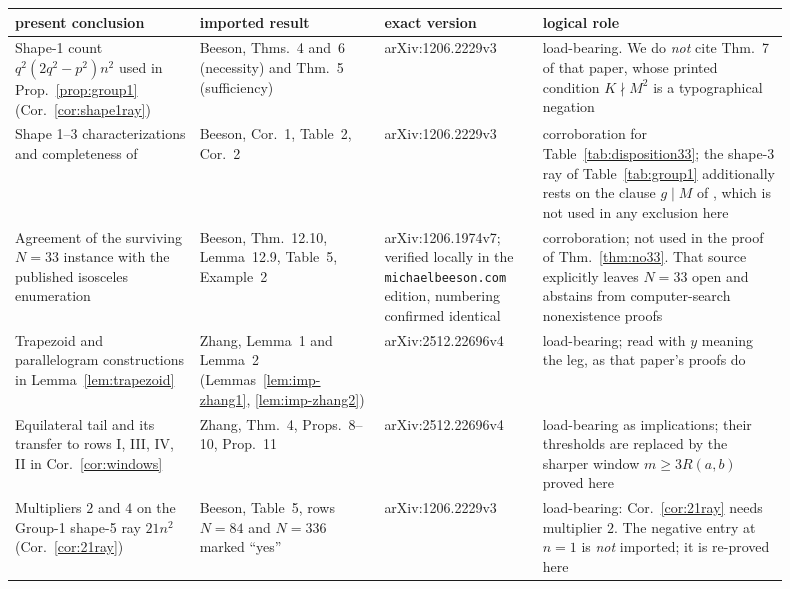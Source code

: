 \documentclass[11pt]{amsart}
\theoremstyle{definition}
\theoremstyle{remark}
\newcommand{\pathcode}[1]{\nolinkurl{#1}}
\begin{document}
\begin{table}[ht]
\centering
\small
\renewcommand{\arraystretch}{1.16}
\begin{tabular}{@{}>{\raggedright\arraybackslash}p{0.215\linewidth}
>{\raggedright\arraybackslash}p{0.215\linewidth}
>{\raggedright\arraybackslash}p{0.185\linewidth}
>{\raggedright\arraybackslash}p{0.28\linewidth}@{}}
\toprule
present conclusion & imported result & exact version & logical role \\
\midrule
Shape-1 count $q^2(2q^2-p^2)n^2$ used in Prop.~\ref{prop:group1}
 (Cor.~\ref{cor:shape1ray})
 & Beeson, Thms.~4 and~6 (necessity) and Thm.~5 (sufficiency)
 & arXiv:1206.2229v3
 & load-bearing.  We do \emph{not} cite Thm.~7 of that paper, whose printed
   condition $K\nmid M^2$ is a typographical negation \\
Shape 1--3 characterizations and completeness of
 \cite[Tables~1--3]{Beeson2229}
 & Beeson, Cor.~1, Table~2, Cor.~2
 & arXiv:1206.2229v3
 & corroboration for Table~\ref{tab:disposition33}; the shape-3 ray of
   Table~\ref{tab:group1} additionally rests on the clause $g\mid M$ of
   \cite[Thm.~14]{Beeson2229}, which is not used in any exclusion here \\
Agreement of the surviving $N=33$ instance with the published isosceles
 enumeration
 & Beeson, Thm.~12.10, Lemma~12.9, Table~5, Example~2
 & arXiv:1206.1974v7; verified locally in the
   \pathcode{michaelbeeson.com} edition, numbering confirmed identical
 & corroboration; not used in the proof of Thm.~\ref{thm:no33}.  That
   source explicitly leaves $N=33$ open and abstains from
   computer-search nonexistence proofs \\
Trapezoid and parallelogram constructions in Lemma~\ref{lem:trapezoid}
 & Zhang, Lemma~1 and Lemma~2 (Lemmas~\ref{lem:imp-zhang1},
   \ref{lem:imp-zhang2})
 & arXiv:2512.22696v4
 & load-bearing; read with $y$ meaning the leg, as that paper's proofs do \\
Equilateral tail and its transfer to rows I, III, IV, II in
 Cor.~\ref{cor:windows}
 & Zhang, Thm.~4, Props.~8--10, Prop.~11
 & arXiv:2512.22696v4
 & load-bearing as implications; their thresholds are replaced by the
   sharper window $m\ge3R(a,b)$ proved here \\
Multipliers $2$ and $4$ on the Group-1 shape-5 ray $21n^2$
 (Cor.~\ref{cor:21ray})
 & Beeson, Table~5, rows $N=84$ and $N=336$ marked ``yes''
 & arXiv:1206.2229v3
 & load-bearing: Cor.~\ref{cor:21ray} needs multiplier $2$.  The negative
   entry at $n=1$ is \emph{not} imported; it is re-proved here \\

\end{tabular}
\end{table}
\end{document}
